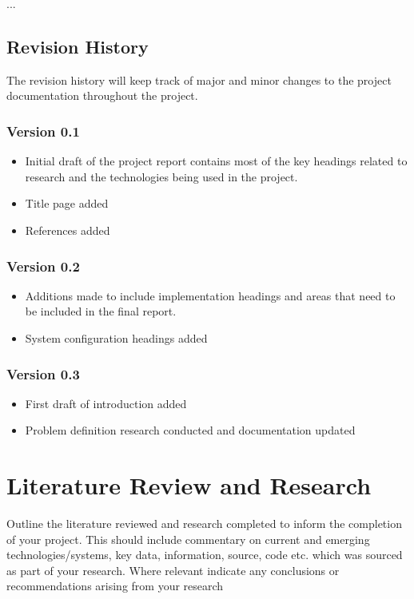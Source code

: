 \documentclass[12pt,a4paper,titlepage]{article}
\begin{document}
...

\subsection{Revision History}

The revision history will keep track of major and minor changes to the project documentation throughout the project. 

\subsubsection*{Version 0.1}

\begin{itemize}
\item{Initial draft of the project report contains most of the key headings related to research and the technologies being used in the project.}
\item{Title page added}
\item{References added}
\end{itemize}

\subsubsection*{Version 0.2}
\begin{itemize}
\item{Additions made to include implementation headings and areas that need to be included in the final report.}
\item{System configuration headings added}
\end{itemize}

\subsubsection*{Version 0.3}

\begin{itemize}
\item{First draft of introduction added}
\item{Problem definition research conducted and documentation updated}
\end{itemize}

\section{Literature Review and Research}
Outline the literature reviewed and research completed to inform the completion of your project.  This should include commentary on current and emerging technologies/systems, key data, information, source, code etc. which was sourced as part of your research.  Where relevant indicate any conclusions or recommendations arising from your research
\end{document}
